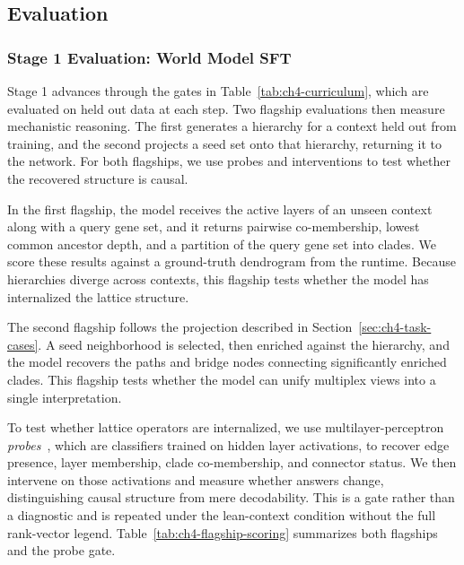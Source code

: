 \documentclass[thesis,letterpaper,12pt]{utthesis}
\begin{document}
\subsection{Evaluation}\label{sec:ch4-eval}
\subsubsection{Stage 1 Evaluation: World Model SFT}\label{sec:ch4-stage1-eval}
Stage 1 advances through the gates in Table~\ref{tab:ch4-curriculum}, which are evaluated on held out data at each step. Two flagship evaluations then measure mechanistic reasoning. The first generates a hierarchy for a context held out from training, and the second projects a seed set onto that hierarchy, returning it to the network. For both flagships, we use probes and interventions to test whether the recovered structure is causal.

In the first flagship, the model receives the active layers of an unseen context along with a query gene set, and it returns pairwise co-membership, lowest common ancestor depth, and a partition of the query gene set into clades. We score these results against a ground-truth dendrogram from the runtime. Because hierarchies diverge across contexts, this flagship tests whether the model has internalized the lattice structure.

The second flagship follows the projection described in Section~\ref{sec:ch4-task-cases}. A seed neighborhood is selected, then enriched against the hierarchy, and the model recovers the paths and bridge nodes connecting significantly enriched clades. This flagship tests whether the model can unify multiplex views into a single interpretation.

To test whether lattice operators are internalized, we use multilayer-perceptron \textit{probes}~\cite{alain2016understanding}, which are classifiers trained on hidden layer activations, to recover edge presence, layer membership, clade co-membership, and connector status. We then intervene on those activations and measure whether answers change, distinguishing causal structure from mere decodability. This is a gate rather than a diagnostic and is repeated under the lean-context condition without the full rank-vector legend. Table~\ref{tab:ch4-flagship-scoring} summarizes both flagships and the probe gate.
\end{document}
